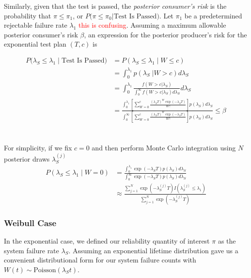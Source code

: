 \documentclass[12pt]{article}
\begin{document}
Similarly, given that the test is passed, the \emph{posterior consumer's risk}
is the probability that $\pi \leq \pi_1$, or $P \text{(}\pi \leq \pi_0 \vert
\text{Test Is Passed)}$.  Let $\pi_1$ be a predetermined rejectable
failure rate $\lambda_1$ \textcolor{red}{this is confusing}. Assuming a maximum allowable posterior consumer's
risk $\beta$, an expression for the posterior producer's risk for the
exponential test plan $(T,c)$ is

$$
\begin{aligned}
    P(\lambda_S \leq \lambda_1 \; \vert \; \text{Test Is Passed)} &= P(\lambda_S
    \leq \lambda_1 \; \vert \; W \leq c) \\ &= \int_{0}^{\lambda_1} p(\lambda_S \;
    \vert W > c) d\lambda_S \\ &= \int_{0}^{\lambda_1} \frac{f(W > c \vert
    \lambda_S)}{\int_{0}^{\infty} f(W > c \vert \lambda_S) d\lambda_S} d\lambda_S \\ &=
    \frac{\int_{0}^{\lambda_1} [ \sum_{W=0}^c \frac{(\lambda_S T)^W
    \exp(-\lambda_S T)}{W!}]p(\lambda_S)d\lambda_S} {\int_{0}^{\infty} [
    \sum_{W=0}^c \frac{(\lambda_S T)^W \exp(-\lambda_S
    T)}{W!}]p(\lambda_S)d\lambda_S} \leq \beta
\end{aligned}
$$
\\
\\
For simplicity, if we fix $c = 0$ and then perform Monte Carlo integration
using $N$ posterior draws $ \lambda_S^{(j)} $ $$
\begin{aligned}
	 P(\lambda_S \leq \lambda_1 \; \vert \; W = 0) &= \frac{\int_{0}^{\lambda_1}
	 \exp(-\lambda_S T)p(\lambda_S)d\lambda_S} {\int_{0}^{\infty} \exp(-\lambda_S
	 T)p(\lambda_S)d\lambda_S} \\ &\approx \frac{\sum_{j = 1}^{N}
	 \exp(-\lambda_S^{(j)} T)I(\lambda_S^{(j)} \leq \lambda_1)} {\sum_{j = 1}^{N}
	 \exp(-\lambda_S^{(j)} T)}
\end{aligned}
$$

\subsubsection{Weibull Case}
In the exponential case, we defined our reliability quantity of interest $\pi$ as the system failure rate
$\lambda_S$.  Assuming an exponential lifetime distribution gave us a convenient distributional
form for our system failure counts with $W(t) \sim \text{Poisson}(\lambda_S t)$.
\end{document}
